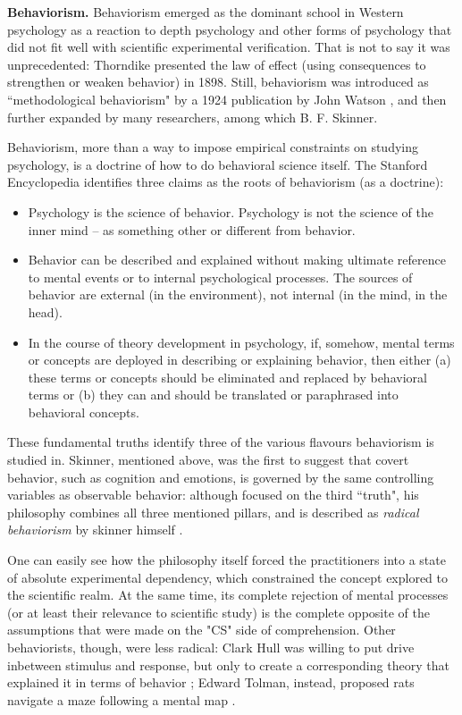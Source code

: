 \documentclass[../main.tex]{subfiles}
\begin{document}
\vspace{4pt}
\textbf{Behaviorism.}
Behaviorism emerged as the dominant school in Western psychology as a reaction to depth psychology and other forms of psychology that did not fit well with scientific experimental verification. That is not to say it was unprecedented: Thorndike presented the law of effect (using consequences to strengthen or weaken behavior) in 1898. Still, behaviorism was introduced as ``methodological behaviorism" by a 1924 publication by John Watson  \parencite{watsonUnverbalizedHumanBehavior1924}, and then further expanded by many researchers, among which B. F. Skinner.

Behaviorism, more than a way to impose empirical constraints on studying psychology, is a doctrine of how to do behavioral science itself. The Stanford Encyclopedia identifies three claims as the roots of behaviorism (as a doctrine):
\begin{itemize}
    \item Psychology is the science of behavior. Psychology is not the science of the inner mind – as something other or different from behavior.
    \item Behavior can be described and explained without making ultimate reference to mental events or to internal psychological processes. The sources of behavior are external (in the environment), not internal (in the mind, in the head).
    \item In the course of theory development in psychology, if, somehow, mental terms or concepts are deployed in describing or explaining behavior, then either (a) these terms or concepts should be eliminated and replaced by behavioral terms or (b) they can and should be translated or paraphrased into behavioral concepts.
\end{itemize}
These fundamental truths identify three of the various flavours behaviorism is studied in. Skinner, mentioned above, was the first to suggest that covert behavior, such as cognition and emotions, is governed by the same controlling variables as observable behavior: although focused on the third ``truth", his philosophy combines all three mentioned pillars, and is described as \textit{radical behaviorism} by skinner himself  \parencite{skinnerBehaviorism1974}.

One can easily see how the philosophy itself forced the practitioners into a state of absolute experimental dependency, which constrained the concept explored to the scientific realm. At the same time, its complete rejection of mental processes (or at least their relevance to scientific study) is the complete opposite of the assumptions that were made on the "CS" side of comprehension. Other behaviorists, though, were less radical: Clark Hull was willing to put drive inbetween stimulus and response, but only to create a corresponding theory that explained it in terms of behavior \parencite{hullGoalAttractionDirecting1931}; Edward Tolman, instead, proposed rats navigate a maze following a mental map \parencite{tolmanCognitiveMapsRats1948}.
\end{document}
